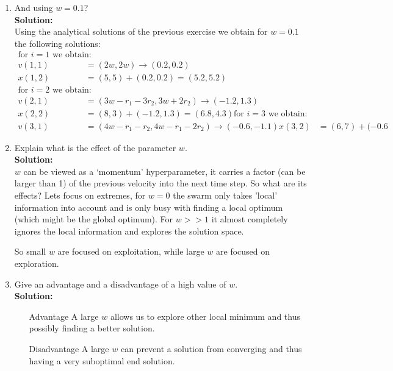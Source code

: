 \documentclass[a4paper]{article}
\begin{document}
\begin{enumerate}
\begin{enumerate}
	
	\item And using $w = 0.1$?\\
	\textbf{Solution:}\\
	Using the analytical solutions of the previous exercise we obtain for $w = 0.1$ the following solutions:
	\begin{align*}
	    \text{for $i = 1$ we obtain:}\\
	    v(1,1) &= (2w, 2w) \rightarrow (0.2, 0.2)\\
	    x(1,2) &= (5,5) + (0.2, 0.2) = (5.2, 5.2)\\
	    \text{for $i = 2$ we obtain:}\\
	    v(2,1) &= (3w - r_1 - 3r_2, 3w + 2r_2) \rightarrow (-1.2, 1.3)\\
	    x(2,2) &= (8,3) + (-1.2, 1.3) = (6.8, 4.3)
	    \text{for $i = 3$ we obtain:}\\
	    v(3,1) &= (4w - r_1 - r_2, 4w - r_1 - 2r_2) \rightarrow (-0.6, -1.1)
	    x(3,2) &= (6,7) + (-0.6
	\end{align*}
	\item Explain what is the effect of the parameter $w$.\\
	\textbf{Solution:}\\
	$w$ can be viewed as a `momentum' hyperparameter, it carries a factor (can be larger than 1) of the previous velocity into the next time step. So what are its effects? Lets focus on extremes, for $w = 0$ the swarm only takes 'local' information into account and is only busy with finding a local optimum (which might be the global optimum). For $w >> 1$ it almost completely ignores the local information and explores the solution space.\bigskip
	
	So small $w$ are focused on exploitation, while large $w$ are focused on exploration.
	
	\item Give an advantage and a disadvantage of a high value of $w$.\\
	\textbf{Solution:}\\
	\begin{enumerate}
	    \item[Advantage] A large $w$ allows us to explore other local minimum and thus possibly finding a better solution.
	    \item[Disadvantage] A large $w$ can prevent a solution from converging and thus having a very suboptimal end solution.
	\end{enumerate}
	
\end{enumerate}


\end{enumerate}
\end{document}
